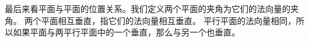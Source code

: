 \documentclass[12pt,UTF8]{ctexbook}
\begin{document}
\begin{so}
    
\end{so}

最后来看平面与平面的位置关系。我们定义两个平面的夹角为它们的法向量的夹角。
两个平面相互垂直，指它们的法向量相互垂直。
平行平面的法向量相同，所以如果平面与两平行平面中的一个垂直，那么与另一个也垂直。
\end{document}
